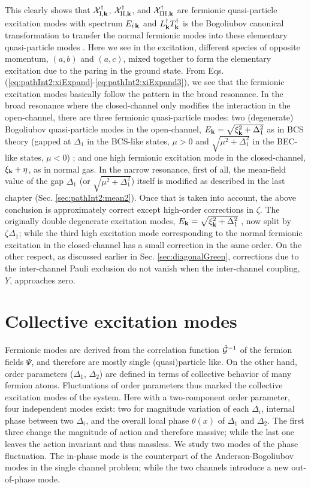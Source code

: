 This clearly shows that $\mathcal{X}^{\dagger}_{\text{I},\mathbf{k}}$, $\mathcal{X}^{\dagger}_{\text{II},\mathbf{k}}$, and $\mathcal{X}^{\dagger}_{\text{III},\mathbf{k}}$ are fermionic quasi-particle excitation modes with spectrum $E_{i\,\mathbf{k}}$ and   $L^{\dagger}_{\mathbf{k}}T^{\dagger}_{\mathbf{k}}$ is  the Bogoliubov canonical transformation to transfer the normal fermionic modes into these elementary quasi-particle modes .  Here we see in the excitation, different species of opposite momentum, $(a,b)$ and $(a,c)$, mixed together to form the elementary excitation due to the paring in the ground state.  
  From Eqs. (\ref{eq:pathInt2:xiExpand}-\ref{eq:pathInt2:xiExpand3}), we see that the fermionic excitation modes basically follow the pattern in the broad resonance.  In the broad resonance where the closed-channel only modifies the interaction in the open-channel,  there are  three fermionic quasi-particle modes: two (degenerate) Bogoliubov quasi-particle modes  in the open-channel, $E_{\mathbf{k}}=\sqrt{\xi^{2}_{\mathbf{k}}+\Delta_{1}^{2}}$ as in BCS theory (gapped at $\Delta_{1}$ in the BCS-like states, $\mu>0$ and ${\sqrt{\mu^{2}+\Delta_{1}^{2}}}$ in the BEC-like states, $\mu<0$)  
; and one high fermionic excitation mode in the closed-channel, $\xi_{\mathbf{k}}+\eta$, as in normal gas.  In the narrow resonance, first of all, the mean-field value of the gap $\Delta_{1}$ (or $\sqrt{\mu^{2}+\Delta_{1}^{2}}$) itself is modified as described in the last chapter (Sec. \ref{sec:pathInt2:mean2}).  Once that is taken into account, the above conclusion is approximately correct except high-order corrections in $\zeta$.   The originally double degenerate excitation modes, $E_{\mathbf{k}}=\sqrt{\xi^{2}_{\mathbf{k}}+\Delta_{1}^{2}}$ , now split by $\zeta\Delta_{1}$; while the third high excitation mode corresponding to the normal fermionic excitation in the closed-channel has a small correction in the same order.   On the other respect, as discussed earlier in Sec. \ref{sec:diagonalGreen},  corrections  due to the inter-channel Pauli exclusion do not vanish when the inter-channel coupling, $Y$, approaches zero.  

\section{Collective excitation modes}
Fermionic modes are derived from the correlation function $\hat{\mathcal{G}}^{-1}$ of the fermion fields $\Psi$, and therefore are mostly single (quasi)particle like.  On the other hand, order parameters ($\Delta_{1}$, $\Delta_{2}$) are defined in terms of collective behavior of many fermion atoms.  Fluctuations of order parameters thus marked the collective excitation modes of the system. Here with a two-component order parameter, four independent modes exist:   two for magnitude variation of each $\Delta_i$,  internal phase between two $\Delta_i$, and the overall local phase $\theta(x)$ of $\Delta_1$ and $\Delta_2$.  The first three change the magnitude of action and therefore massive; while the last one leaves the action invariant and thus massless. 
We study two modes of the phase fluctuation.  The in-phase mode is the counterpart of the Anderson-Bogoliubov modes in the single channel problem; while the two channels introduce a new out-of-phase mode. 
 

